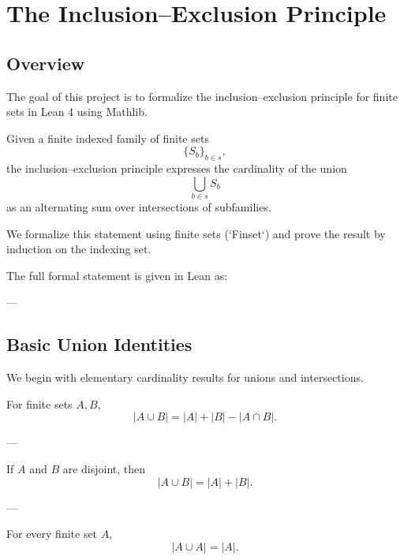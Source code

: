 \chapter{The Inclusion--Exclusion Principle}

\section{Overview}

The goal of this project is to formalize the inclusion--exclusion principle
for finite sets in Lean 4 using Mathlib.

Given a finite indexed family of finite sets
\[
\{S_b\}_{b \in s},
\]
the inclusion--exclusion principle expresses the cardinality of the union
\[
\bigcup_{b \in s} S_b
\]
as an alternating sum over intersections of subfamilies.

We formalize this statement using finite sets (`Finset`) and prove the result
by induction on the indexing set.

The full formal statement is given in Lean as:


---

\section{Basic Union Identities}

We begin with elementary cardinality results for unions and intersections.

\begin{lemma}\label{card_union_two}
For finite sets \(A,B\),
\[
|A \cup B|
=
|A| + |B| - |A \cap B|.
\]
\end{lemma}


---

\begin{lemma}\label{disjoint_union}
If \(A\) and \(B\) are disjoint, then
\[
|A \cup B|
=
|A| + |B|.
\]
\end{lemma}


---

\begin{lemma}\label{same_union}
For every finite set \(A\),
\[
|A \cup A| = |A|.
\]
\end{lemma}

